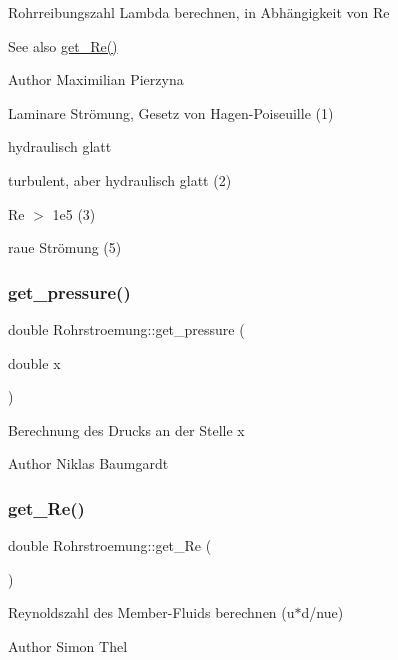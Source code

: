 Rohrreibungszahl Lambda berechnen, in Abhängigkeit von Re \begin{DoxySeeAlso}{See also}
\hyperlink{class_rohrstroemung_aa491056aa77acac305aca0fde9c3e8bc}{get\+\_\+\+Re()} 
\end{DoxySeeAlso}
\begin{DoxyAuthor}{Author}
Maximilian Pierzyna 
\end{DoxyAuthor}
Laminare Strömung, Gesetz von Hagen-\/\+Poiseuille (1)

hydraulisch glatt

turbulent, aber hydraulisch glatt (2)

Re $>$ 1e5 (3)

raue Strömung (5) \mbox{\label{class_rohrstroemung_abf6265814d9ae0d148aeecb6092d8c2f}} 
\subsubsection{\texorpdfstring{get\+\_\+pressure()}{get\_pressure()}}
{\footnotesize\ttfamily double Rohrstroemung\+::get\+\_\+pressure (\begin{DoxyParamCaption}\item[{double}]{x }\end{DoxyParamCaption})}

Berechnung des Drucks an der Stelle x \begin{DoxyAuthor}{Author}
Niklas Baumgardt 
\end{DoxyAuthor}
\mbox{\label{class_rohrstroemung_aa491056aa77acac305aca0fde9c3e8bc}} 
\subsubsection{\texorpdfstring{get\+\_\+\+Re()}{get\_Re()}}
{\footnotesize\ttfamily double Rohrstroemung\+::get\+\_\+\+Re (\begin{DoxyParamCaption}{ }\end{DoxyParamCaption})}

Reynoldszahl des Member-\/\+Fluids berechnen (u$\ast$d/nue) \begin{DoxyAuthor}{Author}
Simon Thel 
\end{DoxyAuthor}
\mbox{\label{class_rohrstroemung_aa4f7d016ed9f920b8e8f0c9bdbae5213}} 
